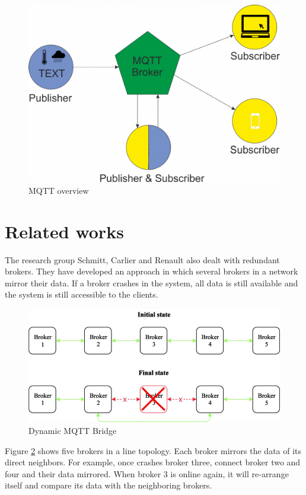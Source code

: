 \begin{figure}
\sidecaption
\includegraphics[scale=.5]{images/images_michael/MQTT_Overview-e1520778847225.png}
\caption{MQTT overview\cite{mqtt_overview}}
\label{fig:mqtt_overview}
\end{figure}
\section{Related works}
\label{sec:2}

The research group Schmitt, Carlier and Renault also dealt with redundant brokers. They have developed an approach in which several brokers in a network mirror their data. If a broker crashes in the system, all data is still available and the system is still accessible to the clients.\\

\begin{figure}
\sidecaption
\includegraphics[scale=.5]{images/images_michael/schmi3-p5-schmi-large.jpg}
\caption{Dynamic MQTT Bridge}
\label{fig:bridge}
\end{figure}
Figure \ref{fig:bridge} shows five brokers in a line topology. Each broker mirrors the data of its direct neighbors. For example, once crashes broker three, connect broker two and four and their data mirrored. When broker 3 is online again, it will re-arrange itself and compare its data with the neighboring brokers.\\


